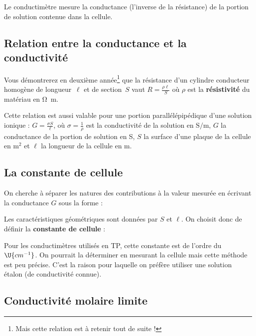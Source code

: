 \documentclass{tp}
\begin{document}
\indent Le conductimètre mesure la conductance (l'inverse de la résistance) de la portion de solution contenue dans la cellule.

\subsection{Relation entre la conductance et la conductivité}

\indent Vous démontrerez en deuxième année\footnote{Mais cette relation est à retenir tout de suite !} que la résistance d'un cylindre conducteur homogène de longueur~$\ell$ et de section~$S$ vaut $R = \frac{\rho \ell}{S}$ où $\rho$ est la \textbf{résistivité} du matériau en \si{\ohm\meter}.

\indent Cette relation est aussi valable pour une portion parallélépipédique d'une solution ionique : $G = \frac{\sigma S}{\ell}$, où $\sigma=\frac{1}{\rho}$ est la conductivité de la solution en $\si{\siemens\per\meter}$, $G$ la conductance de la portion de solution en S, $S$ la surface d'une plaque de la cellule en $\si{\meter^2}$ et $\ell$ la longueur de la cellule en \si{\meter}.

\subsection{La constante de cellule}

\indent On cherche à séparer les natures des contributions à la valeur mesurée en écrivant la conductance $G$ sous la forme :

\vspace{-0.5cm}


\indent Les caractéristiques géométriques sont données par $S$ et $\ell$. On choisit donc de définir la \textbf{constante de cellule} :

\indent Pour les conductimètres utilisés en TP, cette constante est de l'ordre du$\U{cm^{-1}}$. On pourrait la déterminer en mesurant la cellule mais cette méthode est peu précise. C'est la raison pour laquelle on préfère utiliser une solution étalon (de conductivité connue).


\subsection{Conductivité molaire limite}
\end{document}
